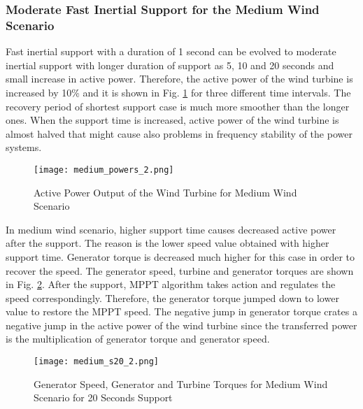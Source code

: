 \subsubsection{Moderate Fast Inertial Support for the Medium Wind Scenario}
Fast inertial support with a duration of 1 second can be evolved to moderate inertial support with longer duration of support as 5, 10 and 20 seconds and small increase in active power. Therefore, the active power of the wind turbine is increased by 10\% and it is shown in Fig. \ref{midpowers} for three different time intervals. The recovery period of shortest support case is much more smoother than the longer ones. When the support time is increased, active power of the wind turbine is almost halved that might cause also problems in frequency stability of the power systems. \par
\begin{figure}[h!]
	\centering
	\texttt{[image: medium\_powers\_2.png]}
	\caption{Active Power Output of the Wind Turbine for Medium Wind Scenario}
	\label{midpowers}
\end{figure}
In medium wind scenario, higher support time causes decreased active power after the support. The reason is the lower speed value obtained with higher support time. Generator torque is decreased much higher for this case in order to recover the speed. The generator speed, turbine and generator torques are shown in Fig. \ref{mid_torques3}. After the support, MPPT algorithm takes action and regulates the speed correspondingly. Therefore, the generator torque jumped down to lower value to restore the MPPT speed. The negative jump in generator torque crates a negative jump in the active power of the wind turbine since the transferred power is the multiplication of generator torque and generator speed.\par
\begin{figure}[h!]
	\centering
	\texttt{[image: medium\_s20\_2.png]}
	\caption{Generator Speed, Generator and Turbine Torques for Medium Wind Scenario for 20 Seconds Support}
	\label{mid_torques3}
\end{figure}

